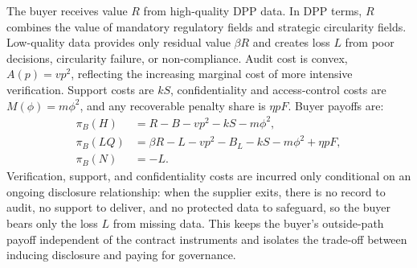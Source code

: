 \documentclass[final,5p,times,authoryear]{elsarticle}
\begin{document}
The buyer receives value $R$ from high-quality DPP data. In DPP terms, $R$ combines the value of mandatory regulatory fields and strategic circularity fields. Low-quality data provides only residual value $\beta R$ and creates loss $L$ from poor decisions, circularity failure, or non-compliance. Audit cost is convex, $A(p)=vp^2$, reflecting the increasing marginal cost of more intensive verification. Support costs are $kS$, confidentiality and access-control costs are $M(\phi)=m\phi^2$, and any recoverable penalty share is $\eta pF$. Buyer payoffs are:
\begin{align}
\pi_B(H)&=R-B-vp^2-kS-m\phi^2,\\
\pi_B(LQ)&=\beta R-L-vp^2-B_L-kS-m\phi^2+\eta pF,\\
\pi_B(N)&=-L.
\end{align}
Verification, support, and confidentiality costs are incurred only conditional on an ongoing disclosure relationship: when the supplier exits, there is no record to audit, no support to deliver, and no protected data to safeguard, so the buyer bears only the loss $L$ from missing data. This keeps the buyer's outside-path payoff independent of the contract instruments and isolates the trade-off between inducing disclosure and paying for governance.
\end{document}
